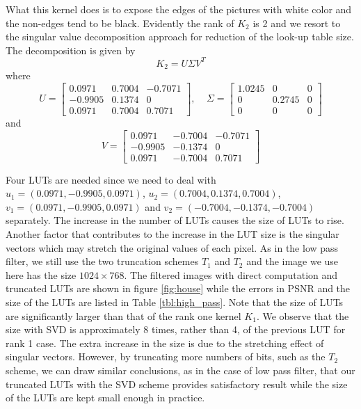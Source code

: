 \documentclass[12pt]{amsart}
\theoremstyle{definition}
\theoremstyle{remark}
\numberwithin{thm}{section}
\begin{document}
What this kernel does is to expose the edges of the pictures with white  color and the non-edges tend to be black. Evidently the rank of $K_2$ is 2 and we resort to the singular value decomposition approach for reduction of the look-up table size. The decomposition is given by 
$$
K_2=U\Sigma V^T
$$
where
$$
U=
\begin{bmatrix}
 0.0971 & 0.7004 & -0.7071\\
-0.9905 & 0.1374 & 0\\
 0.0971 & 0.7004 & 0.7071
\end{bmatrix}
, \ \ \ \ \ \Sigma=
\begin{bmatrix}
1.0245 & 0 & 0\\
0& 0.2745 & 0\\
0 & 0 & 0
\end{bmatrix}
$$
and
$$
V=
\begin{bmatrix}
 0.0971 & -0.7004 & -0.7071\\
-0.9905 & -0.1374 & 0\\
 0.0971 & -0.7004 & 0.7071
\end{bmatrix}
$$

Four LUTs are needed since we need to deal with $u_1=(0.0971,-0.9905,0.0971)$, $u_2=(0.7004,0.1374,0.7004)$, $v_1=(0.0971,-0.9905,0.0971)$ and $v_2=(-0.7004,-0.1374,-0.7004)$ separately. The increase in the number of LUTs causes the size of LUTs to rise. Another factor that contributes to the increase in the LUT size is the singular vectors which may stretch the original values of each pixel. As in the low pass filter, we still use the two truncation schemes $T_1$ and $T_2$ and the image we use here has the size $1024\times 768$. The filtered images with direct computation and truncated LUTs are shown in figure \ref{fig:house} while the errors in PSNR and the size of the LUTs are listed in Table \ref{tbl:high_pass}. 
Note that the size of LUTs are significantly larger than that of the rank one kernel $K_1$. We observe that the size with SVD is approximately 8 times, rather than 4, of the previous LUT for rank 1 case. The extra increase in the size is due to the stretching effect of singular vectors. However, by truncating more numbers of bits, such as the $T_2$ scheme, we can draw similar conclusions, as in the case of low pass filter, that our truncated LUTs with the SVD scheme provides satisfactory result while the size of the LUTs are kept small enough in practice. 
\end{document}
